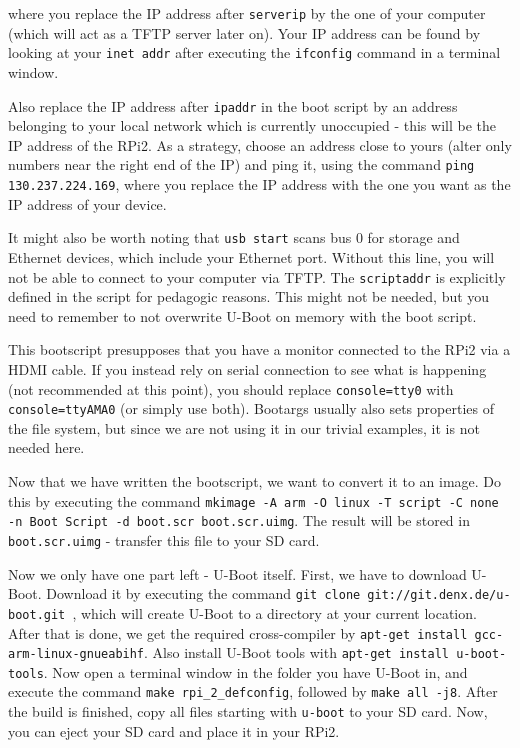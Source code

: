 \documentclass[a4paper,11pt,reqno]{amsart}
\begin{document}
where you replace the IP address after \texttt{serverip} by the one of your computer (which will act as a TFTP server later on). Your IP address can be found by looking at your \texttt{inet addr} after executing the \texttt{ifconfig} command in a terminal window.

Also replace the IP address after \texttt{ipaddr} in the boot script by an address belonging to your local network which is currently unoccupied - this will be the IP address of the RPi2. As a strategy, choose an address close to yours (alter only numbers near the right end of the IP) and ping it, using the command \texttt{ping 130.237.224.169}, where you replace the IP address with the one you want as the IP address of your device.

It might also be worth noting that \texttt{usb start} scans bus 0 for storage and Ethernet devices, which include your Ethernet port. Without this line, you will not be able to connect to your computer via TFTP. The \texttt{scriptaddr} is explicitly defined in the script for pedagogic reasons. This might not be needed, but you need to remember to not overwrite U-Boot on memory with the boot script. 

This bootscript presupposes that you have a monitor connected to the RPi2 via a HDMI cable. If you instead rely on serial connection to see what is happening (not recommended at this point), you should replace \texttt{console=tty0} with \texttt{console=ttyAMA0} (or simply use both). Bootargs usually also sets properties of the file system, but since we are not using it in our trivial examples, it is not needed here.

Now that we have written the bootscript, we want to convert it to an image. Do this by executing the command \texttt{mkimage -A arm -O linux -T script -C none -n Boot Script -d boot.scr boot.scr.uimg}. The result will be stored in \texttt{boot.scr.uimg} - transfer this file to your SD card.

Now we only have one part left - U-Boot itself. First, we have to download U-Boot. Download it by executing the command \texttt{git clone git://git.denx.de/u-boot.git
}, which will create U-Boot to a directory at your current location. After that is done, we get the required cross-compiler by \texttt{apt-get install gcc-arm-linux-gnueabihf}. Also install U-Boot tools with \texttt{apt-get install u-boot-tools}. Now open a terminal window in the folder you have U-Boot in, and execute the command \texttt{make rpi\_2\_defconfig}, followed by \texttt{make all -j8}. After the build is finished, copy all files starting with \texttt{u-boot} to your SD card. Now, you can eject your SD card and place it in your RPi2.
\end{document}
